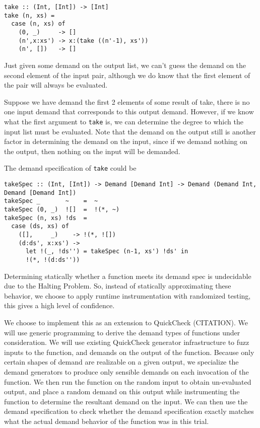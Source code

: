 \documentclass{article}
\begin{document}
\begin{verbatim}
take :: (Int, [Int]) -> [Int]
take (n, xs) =
  case (n, xs) of
    (0, _)     -> []
    (n',x:xs') -> x:(take ((n'-1), xs'))
    (n', [])   -> []
\end{verbatim}

Just given some demand on the output list, we can't guess the demand
on the second element of the input pair, although we do know that the
first element of the pair will always be evaluated.

Suppose we have demand the first 2 elements of some result of take,
there is no one input demand that corresponds to this output
demand. However, if we know what the first argument to \verb|take| is, we
can determine the degree to which the input list must be
evaluated. Note that the demand on the output still is another factor
in determining the demand on the input, since if we demand nothing on
the output, then nothing on the input will be demanded.

The demand specification of \verb|take| could be

\begin{verbatim}
takeSpec :: (Int, [Int]) -> Demand [Demand Int] -> Demand (Demand Int, Demand [Demand Int])
takeSpec _       ~    =  ~
takeSpec (0, _)  ![]  =  !(*, ~)
takeSpec (n, xs) !ds  =
  case (ds, xs) of
    ([],     _)    -> !(*, ![])
    (d:ds', x:xs') ->
      let !(_, !ds'') = takeSpec (n-1, xs') !ds' in
      !(*, !(d:ds''))
\end{verbatim}

Determining statically whether a function meets its demand spec is
undecidable due to the Halting Problem. So, instead of statically
approximating these behavior, we choose to apply runtime
instrumentation with randomized testing, this gives a high level of
confidence.

We choose to implement this as an extension to QuickCheck
(CITATION). We will use generic programming to derive the demand types
of functions under consideration. We will use existing QuickCheck
generator infrastructure to fuzz inputs to the function, and demands
on the output of the function. Because only certain shapes of demand
are realizable on a given output, we specialize the demand generators
to produce only sensible demands on each invocation of the
function. We then run the function on the random input to obtain
un-evaluated output, and place a random demand on this output while
instrumenting the function to determine the resultant demand on the
input. We can then use the demand specification to check whether the
demand specification exactly matches what the actual demand behavior
of the function was in this trial.
\end{document}
